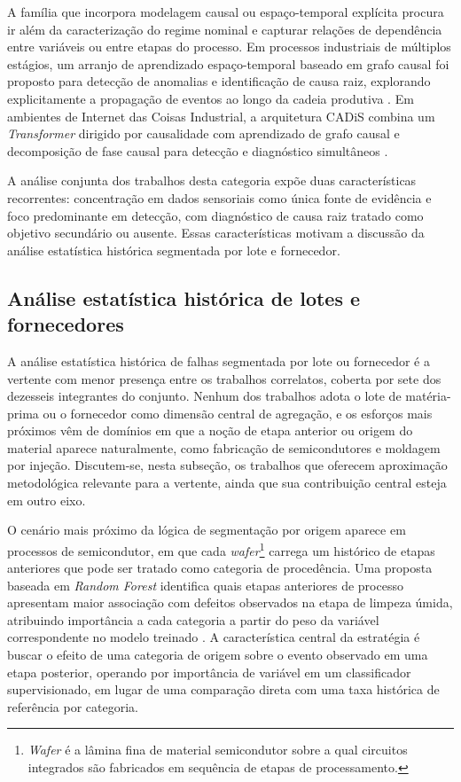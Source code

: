 A família que incorpora modelagem causal ou espaço-temporal explícita procura ir além da caracterização do regime nominal e capturar relações de dependência entre variáveis ou entre etapas do processo. Em processos industriais de múltiplos estágios, um arranjo de aprendizado espaço-temporal baseado em grafo causal foi proposto para detecção de anomalias e identificação de causa raiz, explorando explicitamente a propagação de eventos ao longo da cadeia produtiva \cite{xu2026anomaly}. Em ambientes de Internet das Coisas Industrial, a arquitetura CADiS combina um \emph{Transformer} dirigido por causalidade com aprendizado de grafo causal e decomposição de fase causal para detecção e diagnóstico simultâneos \cite{zeng2026cadis}.

A análise conjunta dos trabalhos desta categoria expõe duas características recorrentes: concentração em dados sensoriais como única fonte de evidência e foco predominante em detecção, com diagnóstico de causa raiz tratado como objetivo secundário ou ausente. Essas características motivam a discussão da análise estatística histórica segmentada por lote e fornecedor.


\subsection{Análise estatística histórica de lotes e fornecedores}
\label{subsec:correlatos_estatistica}

A análise estatística histórica de falhas segmentada por lote ou fornecedor é a vertente com menor presença entre os trabalhos correlatos, coberta por sete dos dezesseis integrantes do conjunto. Nenhum dos trabalhos adota o lote de matéria-prima ou o fornecedor como dimensão central de agregação, e os esforços mais próximos vêm de domínios em que a noção de etapa anterior ou origem do material aparece naturalmente, como fabricação de semicondutores e moldagem por injeção. Discutem-se, nesta subseção, os trabalhos que oferecem aproximação metodológica relevante para a vertente, ainda que sua contribuição central esteja em outro eixo.

O cenário mais próximo da lógica de segmentação por origem aparece em processos de semicondutor, em que cada \emph{wafer}\footnote{\emph{Wafer} é a lâmina fina de material semicondutor sobre a qual circuitos integrados são fabricados em sequência de etapas de processamento.} carrega um histórico de etapas anteriores que pode ser tratado como categoria de procedência. Uma proposta baseada em \emph{Random Forest} identifica quais etapas anteriores de processo apresentam maior associação com defeitos observados na etapa de limpeza úmida, atribuindo importância a cada categoria a partir do peso da variável correspondente no modelo treinado \cite{yu2026randomforest}. A característica central da estratégia é buscar o efeito de uma categoria de origem sobre o evento observado em uma etapa posterior, operando por importância de variável em um classificador supervisionado, em lugar de uma comparação direta com uma taxa histórica de referência por categoria.


